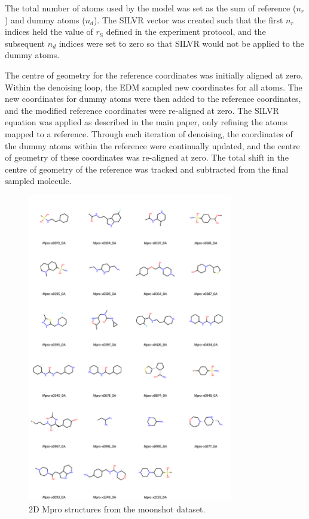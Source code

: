 \documentclass[journal=jacsat,manuscript=article]{achemso}
\begin{document}
\begin{suppinfo}
The total number of atoms used by the model was set as the sum of reference ($n_r$) and dummy atoms ($n_d$). The SILVR vector was created such that the first $n_r$ indices held the value of $r_{\mathrm{S}}$ defined in the experiment protocol, and the subsequent $n_d$ indices were set to zero so that SILVR would not be applied to the dummy atoms. 

The centre of geometry for the reference coordinates was initially aligned at zero. Within the denoising loop, the EDM sampled new coordinates for all atoms. The new coordinates for dummy atoms were then added to the reference coordinates, and the modified reference coordinates were re-aligned at zero. The SILVR equation was applied as described in the main paper, only refining the atoms mapped to a reference. Through each iteration of denoising, the coordinates of the dummy atoms within the reference were continually updated, and the centre of geometry of these coordinates was re-aligned at zero. The total shift in the centre of geometry of the reference was tracked and subtracted from the final sampled molecule. 


\begin{figure}
    \centering
    \includegraphics[width=0.8\textwidth]{paper/Figures/FigS1/mpro_ligands_grid_2d.png}
    \caption{2D Mpro structures from the moonshot dataset.}
    \label{fig:moonshot_data}
\end{figure}
\newpage


\end{suppinfo}
\end{document}
